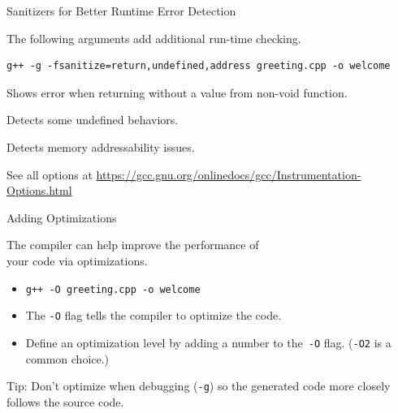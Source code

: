 \documentclass[14pt,aspectratio=1610]{beamer}
\begin{document}
\begin{frame}[fragile]{Sanitizers for Better Runtime Error Detection}

The following arguments add additional run-time checking.
\begin{lstlisting}[language={}, basicstyle=\ttfamily\small\color{codeVariable}]
g++ -g -fsanitize=return,undefined,address greeting.cpp -o welcome
\end{lstlisting}\vspace{-0.8em}
\begin{description}[\texttt{-fsanitize=undefined~~}]
  \item[\colorbox{codeBackground}{-fsanitize=return}]
     Shows error when returning without a value from non-void function.
  \item[\colorbox{codeBackground}{-fsanitize=undefined}]
    Detects some undefined behaviors.
  \item[\colorbox{codeBackground}{-fsanitize=address}]
    Detects memory addressability issues.
\end{description}\vspace{-0.8em}
  \small{See all options at \url{https://gcc.gnu.org/onlinedocs/gcc/Instrumentation-Options.html}}
\end{frame}

\begin{frame}{Adding Optimizations}

The compiler can help improve the performance of\\ your code via optimizations.
\begin{itemize}
\item \lstinline[language={}, basicstyle=\ttfamily\color{codeVariable}]{g++ -O greeting.cpp -o welcome}
\item The \lstinline[language={}, basicstyle=\ttfamily\color{codeVariable}]{-O} flag tells the compiler to optimize the code.
\item Define an optimization level by adding a number to the~\lstinline[language={}, basicstyle=\ttfamily\color{codeVariable}]{-O} flag. (\lstinline[language={}, basicstyle=\ttfamily\color{codeVariable}]{-O2} is a common choice.)
\end{itemize}

Tip: Don't optimize when debugging (\lstinline[language={}, basicstyle=\ttfamily\color{codeVariable}]{-g}) so the generated code more closely follows the source code.
\end{frame}
\end{document}

